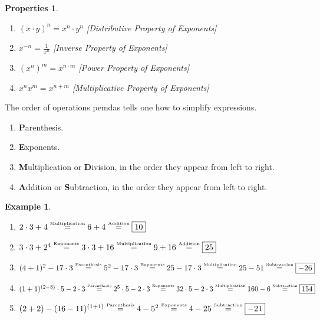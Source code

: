 \documentclass{article}
\theoremstyle{mystyle}
\newtheorem{example}{Example}[section]
\newtheorem{properties}{Properties}[section]
\begin{document}
\begin{properties}
\
\label{property:North_Shore_Exponent_Rules}
\begin{enumerate}[itemsep=0pt]
\item \label{property:north_shore_distributive_property_of_expo} $(x\cdot y)^n = x^n \cdot y^n$ \hfill [Distributive Property of Exponents]
\item \label{property:north_shore_inverse_proerty_of_expo} $x^{-n} = \frac{1}{x^n}$ \hfill [Inverse Property of Exponents]
\item \label{property:north_shore_power_property_of_expo} $(x^n)^m = x^{n\cdot m}$ \hfill [Power Property of Exponents]
\item \label{property:north_shore_product_property_of_expo} $x^{n} x^{m} = x^{n+m}$ \hfill [Multiplicative Property of Exponents]
\end{enumerate}
\end{properties}
The order of operations \gls{pemdas} tells one how to simplify expressions.
\begin{enumerate}[itemsep=0pt]
\label{North_Shore_PEMDAS}
    \item \textbf{P}arenthesis.
    \item \textbf{E}xponents.
    \item \textbf{M}ultiplication or \textbf{D}ivision, in the order they appear from left to right.
    \item \textbf{A}ddition or \textbf{S}ubtraction, in the order they appear from left to right.
\end{enumerate}
\begin{example}
\
\begin{enumerate}[itemsep=0pt]
\item $2\cdot 3+4 \overset{\textrm{\tiny{Multiplication}}}{=} 6+4\overset{\textrm{\tiny{Addition}}}{=}\boxed{10}$
\item $3\cdot 3 + 2^4 \overset{\textrm{\tiny{Exponents}}}{=} 3\cdot 3 + 16 \overset{\textrm{\tiny{Multiplication}}}{=} 9+16 \overset{\textrm{\tiny{Addition}}}{=} \boxed{25}$
\item $(4+1)^2-17\cdot 3\overset{\textrm{\tiny{Parenthesis}}}{=}5^{2}-17\cdot 3\overset{\textrm{\tiny{Exponents}}}{=}25-17\cdot 3 \overset{\textrm{\tiny{Multiplication}}}{=} 25-51 \overset{\textrm{\tiny{Subtraction}}}{=}\boxed{-26}$
\item $(1+1)^{(2+3)}\cdot 5-2\cdot 3\overset{\textrm{\tiny{Parenthesis}}}{=}2^{5}\cdot 5-2\cdot 3\overset{\textrm{\tiny{Exponents}}}{=}32\cdot 5-2\cdot 3\overset{\textrm{\tiny{Multiplication}}}{=} 160-6\overset{\textrm{\tiny{Subtraction}}}{=}\boxed{154}$
\item $(2+2)-(16-11)^{(1+1)}\overset{\textrm{\tiny{Parenthesis}}}{=}4-5^{2}\overset{\textrm{\tiny{Exponents}}}{=}4-25\overset{\textrm{\tiny{Subtraction}}}{=}\boxed{-21}$
\end{enumerate}
\end{example}
\end{document}

